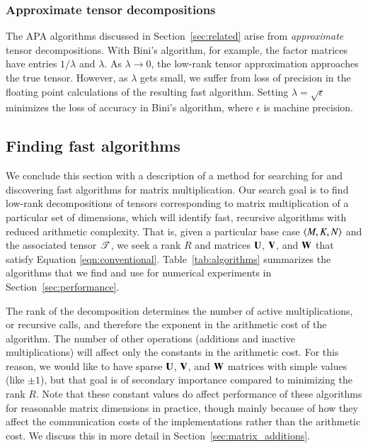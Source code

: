 \documentclass[preprint]{sigplanconf}
\newcommand{\M}[2][]{{\bm{#1\mathbf{\MakeUppercase{#2}}}}}
\newcommand{\T}[2][]{\boldsymbol{#1\mathscr{\MakeUppercase{#2}}}}
\begin{document}
\subsubsection{Approximate tensor decompositions}
The APA algorithms discussed in Section~\ref{sec:related} arise from \emph{approximate} tensor decompositions.
With Bini's algorithm, for example, the factor matrices have entries $1 / \lambda$ and $\lambda$.
As $\lambda \to 0$, the low-rank tensor approximation approaches the true tensor.
However, as $\lambda$ gets small, we suffer from loss of precision in the floating point calculations of the resulting fast algorithm.
Setting $\lambda = \sqrt{\epsilon}$ minimizes the loss of accuracy in Bini's algorithm, where $\epsilon$ is machine precision.







\subsection{Finding fast algorithms}
\label{sec:finding}

We conclude this section with a description of a method for searching for and discovering fast algorithms for matrix multiplication.
Our search goal is to find low-rank decompositions of tensors corresponding to matrix multiplication of a particular set of dimensions, which will identify fast, recursive algorithms with reduced arithmetic complexity. 
That is, given a particular base case $\left\langle M, K, N\right\rangle$ and the associated tensor $\T{T}$, we seek a rank $R$ and matrices $\M{U}$, $\M{V}$, and $\M{W}$ that satisfy Equation \eqref{eqn:conventional}.
Table~\ref{tab:algorithms} summarizes the algorithms that we find and use for numerical experiments in Section~\ref{sec:performance}.

The rank of the decomposition determines the number of active multiplications, or recursive calls, and therefore the exponent in the arithmetic cost of the algorithm.
The number of other operations (additions and inactive multiplications) will affect only the constants in the arithmetic cost.
For this reason, we would like to have sparse $\M{U}$, $\M{V}$, and $\M{W}$ matrices with simple values (like $\pm 1$), but that goal is of secondary importance compared to minimizing the rank $R$.
Note that these constant values do affect performance of these algorithms for reasonable matrix dimensions in practice, though mainly because of how they affect the communication costs of the implementations rather than the arithmetic cost.
We discuss this in more detail in Section~\ref{sec:matrix_additions}.
\end{document}
